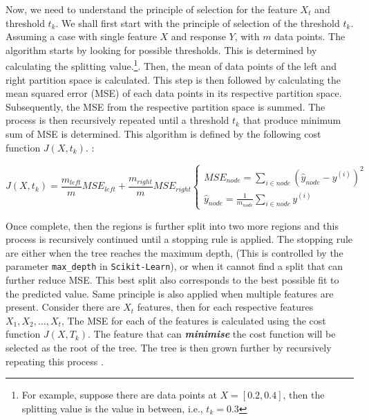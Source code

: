 Now, we need to understand the principle of selection for the feature $X_t$ and threshold $t_k$. We shall first start with the principle of selection of the threshold $t_k$. Assuming a case with single feature $X$ and response $Y$, with $m$ data points. The algorithm starts by looking for possible thresholds. This is determined by calculating the splitting value.\footnote{For example, suppose there are data points at $X = [0.2,0.4]$, then the splitting value is the value in between, i.e., $t_k = 0.3$}. Then, the mean of data points of the left and right partition space is calculated. This step is then followed by calculating the mean squared error (MSE) of each data points in its respective partition space. Subsequently, the MSE from the respective partition space is summed. The process is then recursively repeated until a threshold $t_k$ that produce minimum sum of MSE is determined. This algorithm is defined by the following cost function 
$J(X,t_k)$. \cite{Geron.2019}:

\begin{equation}\label{costfun}
    J(X,t_k) = \frac{m_{left}}{m}MSE_{left} + \frac{m_{right}}{m}MSE_{right}
    \begin{cases}
        MSE_{node} = \sum\limits_{i\in node}(\hat{y}_{node} - y^{(i)} )^2 \\
        \hat{y}_{node} = \frac{1}{m_{node}}\sum\limits_{i\in node} y ^ {(i)}
    \end{cases}   
\end{equation}

Once complete, then the regions is further split into two more regions and this process is recursively continued until a stopping rule is applied. The stopping rule are either when the tree reaches the maximum depth, (This is controlled by the parameter {\tt max\_depth} in {\tt Scikit-Learn}), or when it cannot find a split that can further reduce MSE. This best split also corresponds to the best possible fit to the predicted value. Same principle is also applied when multiple features are present. Consider there are $X_t$ features, then for each respective features $X_1,X_2,\dots,X_t$, The MSE for each of the features is calculated using the cost function $J(X,T_k)$. The feature that can \emph{\textbf{minimise}} the cost function will be selected as the root of the tree. The tree is then grown further by recursively repeating this process \cite{Hastie.2009,Geron.2019}.\\

